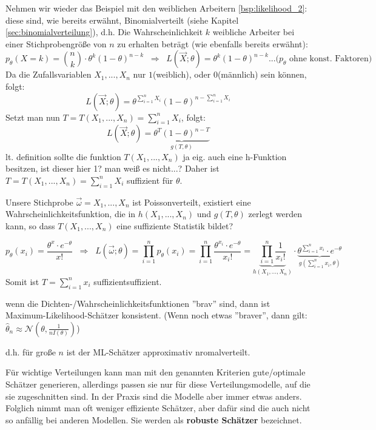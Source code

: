\begin{bsp}
Nehmen wir wieder das Beispiel mit den weiblichen Arbeitern \ref{bsp:likelihood_2}:
diese sind, wie bereits erwähnt, Binomialverteilt (siehe Kapitel \ref{sec:binomialverteilung}), d.h.
Die Wahrscheinlichkeit $k$ weibliche Arbeiter bei einer Stichprobengröße von $n$ zu erhalten beträgt (wie ebenfalls bereits erwähnt):
\[p_\theta(X=k)=\binom{n}{k}\cdot \theta^k(1-\theta)^{n-k}\;\;\Rightarrow\;\;L(\vec X;\theta)=\theta^k(1-\theta)^{n-k}\text{...($p_\theta$ ohne konst. Faktoren)}\]
Da die Zufallsvariablen $X_1,...,X_n$ nur $1$(weiblich), oder $0$(männlich) sein können, folgt:
\[L(\vec X;\theta)=\theta^{\sum_{i=1}^nX_i}(1-\theta)^{n-{\sum_{i=1}^nX_i}}\]
Setzt man nun $T=T(X_1,...,X_n)=\sum_{i=1}^nX_i$, folgt: 
\[L(\vec X;\theta)=\underbrace{\theta^T(1-\theta)^{n-T}}_{g(T,\theta)}\]
{\color{red}lt. definition sollte die funktion $T(X_1,...,X_n)$ ja eig. auch eine h-Funktion besitzen, ist dieser hier 1? man weiß es nicht...?}
Daher ist $T=T(X_1,...,X_n)=\sum_{i=1}^nX_i$ suffizient für $\theta$.
\end{bsp}

\begin{bsp}
Unsere Stichprobe $\vec\omega = X_1, ..., X_n$ ist Poissonverteilt, existiert eine Wahrscheinlichkeitsfunktion, die in $h(X_1,...,X_n)$ und $g(T, \theta)$ zerlegt werden kann, so dass $T(X_1, ..., X_n)$ eine suffiziente Statistik bildet?

\[p_\theta(x_i)=\frac{\theta^x\cdot e^{-\theta}}{x!}\;\;\Rightarrow\;\;L(\vec\omega;\theta)=
\prod_{i=1}^np_\theta(x_i)=\prod_{i=1}^n\frac{\theta^{x_i}\cdot e^{-\theta}}{x_i!}=
\underbrace{\prod_{i=1}^n\frac{1}{x_i!}}_{h(X_1,...,X_n)}\cdot\underbrace{\theta^{\sum_{i=1}^n x_i}\cdot e^{-\theta}}_{g(\sum_{i=1}^n x_i,\theta)}\]
Somit ist $T=\sum_{i=1}^n x_i$ suffizientsuffizient.
\end{bsp}

\begin{satz}
wenn die Dichten-/Wahrscheinlichkeitsfunktionen ''brav'' sind, dann ist Maximum-Likelihood-Schätzer konsistent. (Wenn noch etwas ''braver'', dann gilt: $\hat\theta_n\approx\mathcal{N}\left(\theta,\frac{1}{nI(\theta)}\right)$)

d.h. für große $n$ ist der ML-Schätzer approximativ nromalverteilt.
\end{satz}

Für wichtige Verteilungen kann man mit den genannten Kriterien gute/optimale Schätzer generieren, allerdings passen sie nur für diese Verteilungsmodelle, auf die sie zugeschnitten sind. In der Praxis sind die Modelle aber immer etwas anders. Folglich nimmt man oft weniger effiziente Schätzer, aber dafür sind die auch nicht so anfällig bei anderen Modellen. Sie werden als \textbf{robuste Schätzer} bezeichnet.

